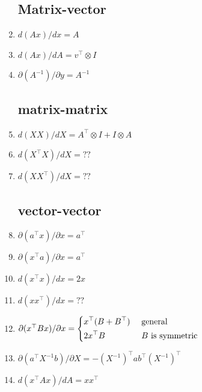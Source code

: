\begin{enumerate}[itemsep=0.2cm]
    \subsection{Matrix-vector}
    
    \item \( d(Ax)/dx = A \)

    \item $d(Ax)/dA = v^\top\otimes I $
    
    \item \( \partial (A^{-1})/\partial y = A^{-1}\)

    \subsection{matrix-matrix}
    \item \(
        d(XX)/dX = A^\top \otimes I+I\otimes A
    \)
    
    \item  $d(X^\top X)/dX = ??$
    
    \item  $d(XX^\top )/dX = ??$

    \subsection{vector-vector}
    \item  $\partial (a^\top x)/\partial x = a^\top$

    \item $\partial (x^\top a)/\partial x = a^\top$

    \item  $d(x^\top x)/dx = 2x$

    \item  $d(xx^\top)/dx = ??$

    \item  \(
        \partial (x^\top Bx)/\partial x = \begin{dcases}
            x^\top(B + B^\top) & \text{ general}\\
            2x^\top B & \text{ $B$ is symmetric}
        \end{dcases}
    \)

    \item  $\partial (a^\top X^{-1}b)/\partial X = -(X^{-1})^\top ab^\top (X^{-1})^\top$

    \item  $d(x^\top Ax)/dA = xx^\top $


\end{enumerate}
